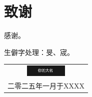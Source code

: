 

\chapter*{致谢}

感谢。

生僻字处理：{旻}、{宬}。


\vspace{2cm}
\begin{flushright}
	\begin{tabular}{c}
	\includegraphics[width=2cm]{./Settings/signature.png}\\
	二零二五年一月于XXXX
	\end{tabular}
\end{flushright}



